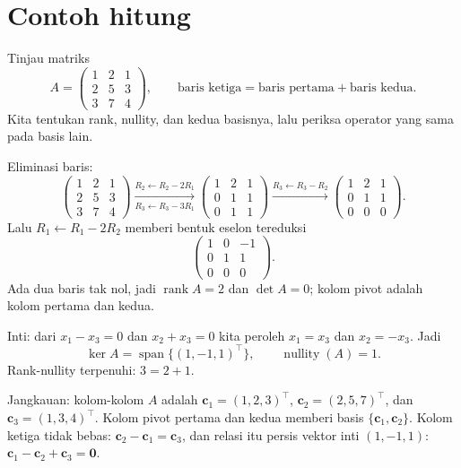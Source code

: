 \section{Contoh hitung}

Tinjau matriks
\[
  A=\begin{pmatrix}1&2&1\\ 2&5&3\\ 3&7&4\end{pmatrix},
  \qquad \text{baris ketiga}=\text{baris pertama}+\text{baris kedua}.
\]
Kita tentukan rank, nullity, dan kedua basisnya, lalu periksa operator yang sama pada basis
lain.

Eliminasi baris:
\[
  \begin{pmatrix}1&2&1\\ 2&5&3\\ 3&7&4\end{pmatrix}
  \xrightarrow[R_{3}\leftarrow R_{3}-3R_{1}]{R_{2}\leftarrow R_{2}-2R_{1}}
  \begin{pmatrix}1&2&1\\ 0&1&1\\ 0&1&1\end{pmatrix}
  \xrightarrow{R_{3}\leftarrow R_{3}-R_{2}}
  \begin{pmatrix}1&2&1\\ 0&1&1\\ 0&0&0\end{pmatrix}.
\]
Lalu $R_{1}\leftarrow R_{1}-2R_{2}$ memberi bentuk eselon tereduksi
\[
  \begin{pmatrix}1&0&-1\\ 0&1&1\\ 0&0&0\end{pmatrix}.
\]
Ada dua baris tak nol, jadi $\operatorname{rank}A=2$ dan $\det A=0$; kolom pivot adalah kolom
pertama dan kedua.

Inti: dari $x_{1}-x_{3}=0$ dan $x_{2}+x_{3}=0$ kita peroleh $x_{1}=x_{3}$ dan
$x_{2}=-x_{3}$.
Jadi
\[
  \ker A=\operatorname{span}\{(1,-1,1)^{\top}\},\qquad \operatorname{nullity}(A)=1 .
\]
Rank-nullity terpenuhi: $3=2+1$.

Jangkauan: kolom-kolom $A$ adalah $\mathbf{c}_{1}=(1,2,3)^{\top}$,
$\mathbf{c}_{2}=(2,5,7)^{\top}$, dan $\mathbf{c}_{3}=(1,3,4)^{\top}$. Kolom pivot pertama
dan
kedua memberi basis $\{\mathbf{c}_{1},\mathbf{c}_{2}\}$. Kolom ketiga tidak bebas:
$\mathbf{c}_{2}-\mathbf{c}_{1}=\mathbf{c}_{3}$, dan relasi itu persis vektor inti
$(1,-1,1)$: $\mathbf{c}_{1}-\mathbf{c}_{2}+\mathbf{c}_{3}=\mathbf{0}$.

